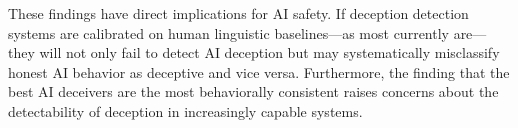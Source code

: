 These findings have direct implications for AI safety. If deception detection systems are calibrated on human linguistic baselines---as most currently are---they will not only fail to detect AI deception but may systematically misclassify honest AI behavior as deceptive and vice versa. Furthermore, the finding that the best AI deceivers are the most behaviorally consistent raises concerns about the detectability of deception in increasingly capable systems.
